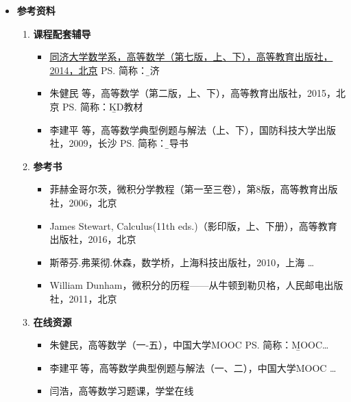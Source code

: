 \begin{itemize}
	\item {\bf 参考资料}
  	\begin{enumerate}
		\item {\bf 课程配套辅导}
	  	\begin{itemize}
	  	  \item \underline{同济大学数学系，高等数学（第七版，上、下），高等教育出版社，2014，北京}
	  	  	\ps{简称：\b 同济}  
	  	  \item 朱健民 等，高等数学（第二版，上、下），高等教育出版社，2015，北京
	  	  	\ps{简称：\b KD教材} 
	      \item 李建平 等，高等数学典型例题与解法（上、下），国防科技大学出版社，2009，长沙
	    	\ps{简称：\b 辅导书} 
	  	\end{itemize}
  		\item {\bf 参考书} 
  		\begin{itemize}
	    	\item 菲赫金哥尔茨，微积分学教程（第一至三卷），第8版，高等教育出版社，2006，北京
	    	\item James Stewart, Calculus(11th eds.)（影印版，上、下册），高等教育出版社，2016，北京
	    	\item 斯蒂芬.弗莱彻.休森，数学桥，上海科技出版社，2010，上海
	    	  \ldots{} 
	    	\item William Dunham，微积分的历程——从牛顿到勒贝格，人民邮电出版社，2011，北京
  		\end{itemize}
  		\item {\bf 在线资源}
  		\begin{itemize}
  		  \item 朱健民，高等数学（一-五），中国大学MOOC%
  		    \ps{简称：\b MOOC}\ldots
  		  \item 李建平\,等，高等数学典型例题与解法（一、二），中国大学MOOC%
  		    \ldots{}
  		  \item 闫浩，高等数学习题课，学堂在线%

\end{itemize}
\end{enumerate}
\end{itemize}
